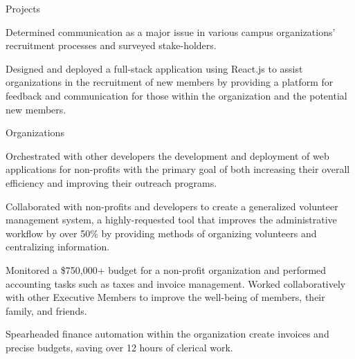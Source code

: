 \documentclass{resume} %
\begin{document}


\begin{workSection}{Projects}
     \customItem[
        title=RushKit,
        duration=July 2022 – Present,
        keyHighlight=Recruitment Web Application,
        location=Atlanta{,} GA
     ]
     \begin{bullets}
        \item Determined communication as a major issue in various campus organizations' recruitment processes and surveyed stake-holders.
        \item Designed and deployed a full-stack application using React.js to assist organizations in the recruitment of new members by providing a platform for feedback and communication for those within the organization and the potential new members.
     \end{bullets}

     \customItem[
        title=Encryption Project,
        duration=February 2020 - April 2020,
        keyHighlight=Python Script,
        location=Atlanta{,} GA
     ]
\end{workSection}


\begin{workSection}{Organizations}
    \customItem[
        title=Bits of Good,
        keyHighlight=Developer,
        duration=January 2023 – Present,
        location=Atlanta{,} GA
    ]
     \begin{bullets}
       \item Orchestrated with other developers the development and deployment of web applications for non-profits with the primary goal of both increasing their overall efficiency and improving their outreach programs.
       \item Collaborated with non-profits and developers to create a generalized volunteer management system, a highly-requested tool that improves the administrative workflow by over 50\% by providing methods of organizing volunteers and centralizing information.

     \end{bullets}
    \customItem[
        title=Delta Chi Fraternity,
        keyHighlight=Treasurer{,} Technology Chair,
        duration=August 2021 – Present,
        location=Atlanta{,} GA
    ]
    \begin{bullets}
        \item Monitored a \$750,000+ budget for a non-profit organization and performed accounting tasks such as taxes and invoice management. Worked collaboratively with other Executive Members to improve the well-being of members, their family, and friends.
        \item Spearheaded finance automation within the organization create invoices and precise budgets, saving over 12 hours of clerical work.
    \end{bullets}
     
     
\end{workSection}
\end{document}
